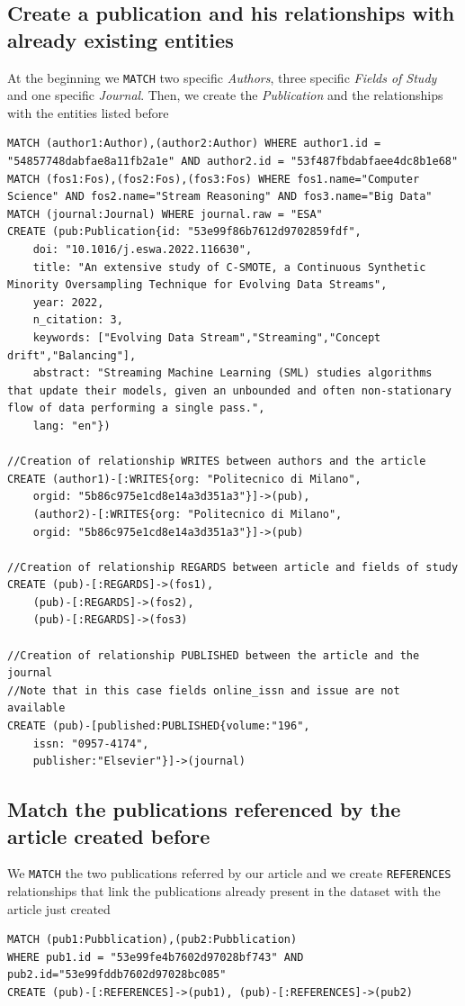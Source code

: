 \documentclass{Configuration_Files/PoliMi3i_thesis}
\begin{document}
\subsection{Create a publication and his relationships with already existing entities}
At the beginning we \verb |MATCH| two specific \emph{Authors}, three specific \emph{Fields of Study} and one specific
\emph{Journal}. Then, we create the \emph{Publication} and the relationships with the entities listed before
\begin{lstlisting}[language=cypher, label=lst:cypher-example]
MATCH (author1:Author),(author2:Author) WHERE author1.id = "54857748dabfae8a11fb2a1e" AND author2.id = "53f487fbdabfaee4dc8b1e68"
MATCH (fos1:Fos),(fos2:Fos),(fos3:Fos) WHERE fos1.name="Computer Science" AND fos2.name="Stream Reasoning" AND fos3.name="Big Data"
MATCH (journal:Journal) WHERE journal.raw = "ESA"
CREATE (pub:Publication{id: "53e99f86b7612d9702859fdf",
    doi: "10.1016/j.eswa.2022.116630",
    title: "An extensive study of C-SMOTE, a Continuous Synthetic Minority Oversampling Technique for Evolving Data Streams",
    year: 2022,
    n_citation: 3,
    keywords: ["Evolving Data Stream","Streaming","Concept drift","Balancing"],
    abstract: "Streaming Machine Learning (SML) studies algorithms that update their models, given an unbounded and often non-stationary flow of data performing a single pass.",
    lang: "en"})

//Creation of relationship WRITES between authors and the article
CREATE (author1)-[:WRITES{org: "Politecnico di Milano",
    orgid: "5b86c975e1cd8e14a3d351a3"}]->(pub),
    (author2)-[:WRITES{org: "Politecnico di Milano",
    orgid: "5b86c975e1cd8e14a3d351a3"}]->(pub)

//Creation of relationship REGARDS between article and fields of study
CREATE (pub)-[:REGARDS]->(fos1),
    (pub)-[:REGARDS]->(fos2),
    (pub)-[:REGARDS]->(fos3)

//Creation of relationship PUBLISHED between the article and the journal
//Note that in this case fields online_issn and issue are not available
CREATE (pub)-[published:PUBLISHED{volume:"196",
    issn: "0957-4174",
    publisher:"Elsevier"}]->(journal)
\end{lstlisting}

\subsection{Match the publications referenced by the article created before}
We \verb |MATCH| the two publications referred by our article and we create \verb |REFERENCES| relationships that link
the publications already present in the dataset with the article just created
\begin{lstlisting}[language=cypher, label=lst:cypher-example]
MATCH (pub1:Pubblication),(pub2:Pubblication)
WHERE pub1.id = "53e99fe4b7602d97028bf743" AND pub2.id="53e99fddb7602d97028bc085"
CREATE (pub)-[:REFERENCES]->(pub1), (pub)-[:REFERENCES]->(pub2)
\end{lstlisting}
\end{document}
